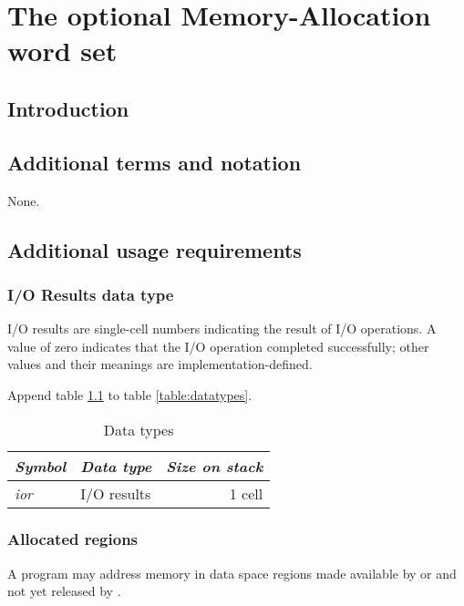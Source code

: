 \chapter{The optional Memory-Allocation word set} %

\section{Introduction} %

\section{Additional terms and notation} %
None.

\section{Additional usage requirements} %

\subsection{I/O Results data type} %
\label{mem:ior}

I/O results are single-cell numbers indicating the result of I/O
operations. A value of zero indicates that the I/O operation
completed successfully; other values and their meanings are
implementation-defined.

Append table \ref{mem:types} to table \ref{table:datatypes}.

\begin{table}[h]
  \begin{center}
	\caption{Data types}
	\label{mem:types}
	\begin{tabular}{llr}
	\hline\hline
	\emph{Symbol}	& \emph{Data type}	& \emph{Size on stack} \\
	\hline
	\emph{ior}		& I/O results			& 1 cell \\
	\hline\hline
	\end{tabular}
  \end{center}
\end{table}


\subsection{Allocated regions} %

A program may address memory in data space regions made available
by  or  and not yet released by .


